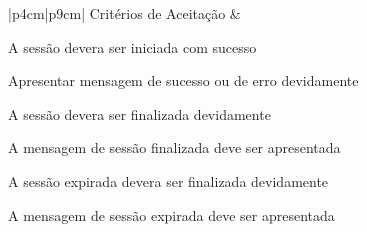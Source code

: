 \begin{tabela}{|p{4cm}|p{9cm}|}
    Critérios de Aceitação &
    \begin{enumalfa}{0.6}
        \item A sessão devera ser iniciada com sucesso
        \item Apresentar mensagem de sucesso ou de erro devidamente
        \item A sessão devera ser finalizada devidamente
        \item A mensagem de sessão finalizada deve ser apresentada
        \item A sessão expirada devera ser finalizada devidamente
        \item A mensagem de sessão expirada deve ser apresentada
    \end{enumalfa}\\
    \hline
\end{tabela}

